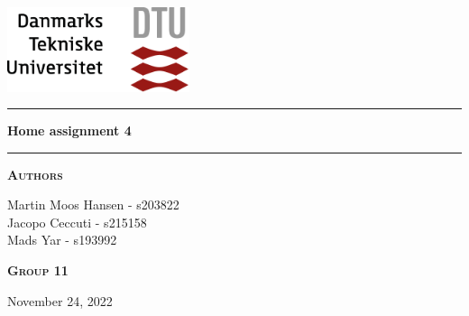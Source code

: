 
\begin{titlepage}
\begin{center}
\vspace{2cm}
\includegraphics[width=0.4\textwidth]{root/dtu.png}~\\[1cm]
\vspace{2cm}

\vspace{2cm}

\hrule
\vspace{.5cm}
{ \huge \bfseries Home assignment 4 } %
\vspace{.5cm}

\hrule
\vspace{1.5cm}

\textsc{\textbf{Authors}}\\
\vspace{.5cm}
\centering

Martin Moos Hansen - s203822\\
Jacopo Ceccuti - s215158\\
Mads Yar - s193992\\

\vspace{2cm}

\textsc{\textbf{Group 11}}\\

\vspace{2cm}

\centering November 24, 2022%
\end{center}
\end{titlepage}
